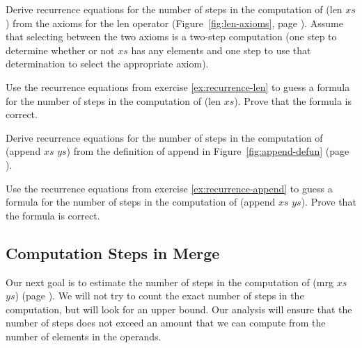 \begin{ExerciseList}

\Exercise
\label{ex:recurrence-len}
Derive recurrence equations for the number of steps in the computation of (len $xs$)
from the axioms for the len operator (Figure~\ref{fig:len-axioms}, page \pageref{fig:len-axioms}).
Assume that selecting between the two axioms is a two-step computation
(one step to determine whether or not $xs$ has any elements
and one step to use that determination to select the appropriate axiom).

\Exercise
Use the recurrence equations from exercise \ref{ex:recurrence-len} to
guess a formula for the number of steps in the computation of (len $xs$).
Prove that the formula is correct.

\Exercise
\label{ex:recurrence-append}
Derive recurrence equations for the number of steps in the computation of (append $xs$ $ys$)
from the definition of append in Figure~\ref{fig:append-defun} (page \pageref{fig:append-defun}).

\Exercise
Use the recurrence equations from exercise \ref{ex:recurrence-append} to
guess a formula for the number of steps in the computation of (append $xs$ $ys$).
Prove that the formula is correct.

\end{ExerciseList}

\subsection{Computation Steps in Merge}
\label{subsec:mrg-steps}

Our next goal is to estimate the number of steps in
the computation of (mrg $xs$ $ys$) (page \pageref{defun:mrg}).
We will not try to count the exact number of steps in the computation,
but will look for an upper bound.
Our analysis
will ensure that the number of steps does not exceed an
amount that we can compute from the number of elements in the operands.

